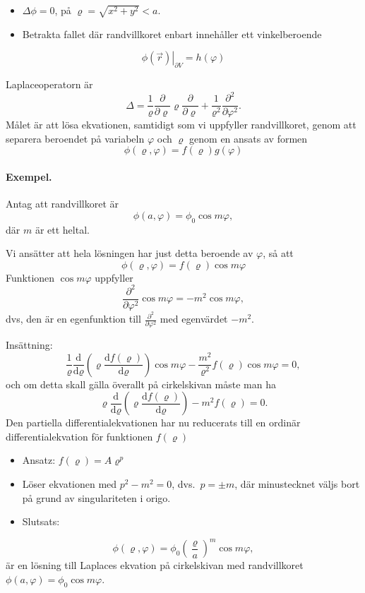 \documentclass[%
oneside,                 %
final,                   %
10pt]{article}
\newenvironment{notice_mdfboxadmon}[1][]{
\begin{notice_mdfboxmdframed}[frametitle=#1]
}
{
\end{notice_mdfboxmdframed}
}
\begin{document}
\begin{notice_mdfboxadmon}
\begin{itemize}
\item $\Delta\phi=0$, på $\varrho=\sqrt{x^2+y^2}<a$. 

\item Betrakta fallet där randvillkoret enbart innehåller ett vinkelberoende
\end{itemize}

\noindent
$$
\left. \phi(\vec{r}) \right|_{\partial V} = h(\varphi)
$$

Laplaceoperatorn är
$$
\Delta = \frac{1}{\varrho} \frac{\partial}{\partial \varrho} \varrho \frac{\partial}{\partial \varrho} +
 \frac{1}{\varrho^2} \frac{\partial^2}{\partial \varphi^2}.
$$
Målet är att lösa ekvationen, samtidigt som vi uppfyller randvillkoret, genom att separera beroendet på variabeln $\varphi$ och $\varrho$ genom en ansats av formen
$$
\phi(\varrho,\varphi) = f(\varrho) g(\varphi)
$$

\paragraph{Exempel.}
Antag att randvillkoret är
$$
\phi(a,\varphi)=\phi_0\cos m\varphi,
$$ 
där $m$ är ett heltal.

Vi ansätter att hela lösningen har just detta beroende av $\varphi$, så att 
$$
\phi(\varrho,\varphi)=f(\varrho)\cos m\varphi
$$
Funktionen $\cos m\varphi$ uppfyller 
$$
\frac{\partial ^2}{\partial \varphi^2} \cos m\varphi = -m^2 \cos m\varphi,
$$
dvs, den är en egenfunktion till $\frac{\partial^2}{\partial \varphi^2}$ med egenvärdet $-m^2$. 

Insättning:
$$
\frac{1}{\varrho} \frac{\mbox{d}}{\mbox{d}\varrho} \left( \varrho \frac{\mbox{d}f(\varrho)}{\mbox{d}\varrho} \right) \cos m \varphi - \frac{m^2}{\varrho^2}f(\varrho)\cos m\varphi=0,
$$
och om detta skall gälla överallt på cirkelskivan måste man ha
$$
\varrho \frac{\mbox{d}}{\mbox{d}\varrho} \left(\varrho \frac{\mbox{d}f(\varrho)}{\mbox{d}\varrho} \right)
-m^2f(\varrho)=0.
$$
Den partiella differentialekvationen har nu reducerats till en ordinär differentialekvation för funktionen $f(\varrho)$

\begin{itemize}
\item Ansatz: $f(\varrho)=A\varrho^p$ 

\item Löser ekvationen med $p^2-m^2=0$, dvs.~$p=\pm m$, där minustecknet väljs bort på grund av singulariteten i origo. 

\item Slutsats:
\end{itemize}

\noindent
$$
\phi(\varrho,\varphi)=\phi_0\left( \frac{\varrho}{a}\right)^m \cos m\varphi,
$$
är en lösning till Laplaces ekvation på cirkelskivan med randvillkoret $\phi(a,\varphi)=\phi_0\cos m\varphi$.
\end{notice_mdfboxadmon} %
\end{document}
